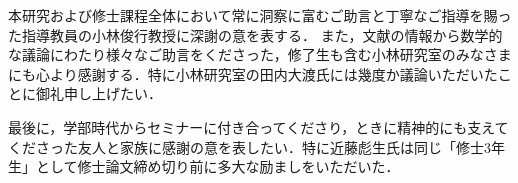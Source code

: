 本研究および修士課程全体において常に洞察に富むご助言と丁寧なご指導を賜った指導教員の小林俊行教授に深謝の意を表する．%
また，文献の情報から数学的な議論にわたり様々なご助言をくださった，修了生も含む小林研究室のみなさまにも心より感謝する．特に小林研究室の田内大渡氏には幾度か議論いただいたことに御礼申し上げたい．

最後に，学部時代からセミナーに付き合ってくださり，ときに精神的にも支えてくださった友人と家族に感謝の意を表したい．特に近藤彪生氏は同じ「修士3年生」として修士論文締め切り前に多大な励ましをいただいた．
